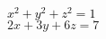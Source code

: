 \documentclass{article}
\begin{document}
\sffamily\sansmath\Large


\null\hfill\textcolor{black}{$x^2 + y^2 + z^2 = 1$}  \\
\null\hfill\textcolor{red!50!black}{$2x + 3y + 6z = 7$}

\vfill
\end{document}
